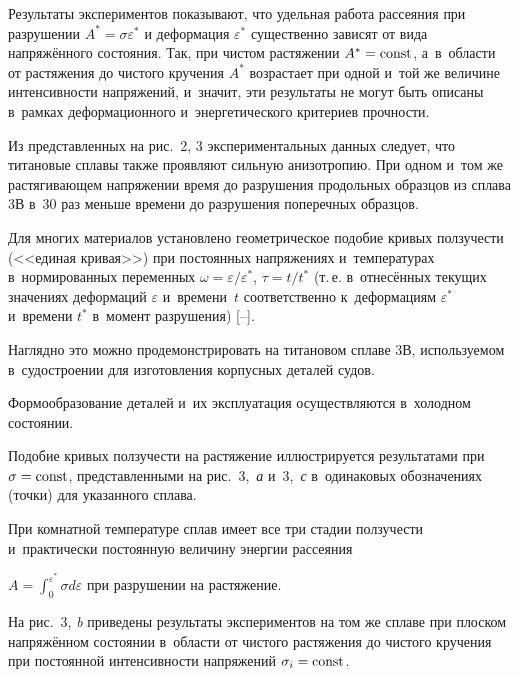 Результаты экспериментов показывают, что удельная работа рассеяния при разрушении $A^{*}=\sigma\varepsilon^{*}$  и деформация $\varepsilon^{*}$ существенно зависят от вида напряжённого состояния. Так, при чистом растяжении $A^{*}=\rm const$, а~в~области от растяжения до чистого кручения $A^{*}$ возрастает при одной и~той же величине интенсивности напряжений, и~значит, эти результаты не могут быть описаны в~рамках деформационного и~энергетического критериев прочности.



Из представленных на рис.~2, 3 экспериментальных данных следует, что титановые сплавы также проявляют сильную анизотропию. При одном и~том же растягивающем напряжении время до разрушения продольных образцов из сплава 3В в~30 раз меньше времени до разрушения поперечных образцов.






Для многих материалов установлено геометрическое подобие кривых ползучести (<<единая кривая>>) при постоянных напряжениях и~температурах в~нормированных переменных $\omega=\varepsilon/\varepsilon^{*}$, $\tau=t/t^{*}$ (т.\,е. в~отнесённых текущих значениях деформаций $\varepsilon$  и~времени~$t$ соответственно к~деформациям $\varepsilon^{*}$  и~времени $t^{*}$ в~момент разрушения) [--].



Наглядно это можно продемонстрировать на титановом сплаве 3В, используемом в~судостроении для изготовления корпусных деталей судов.

Формообразование деталей и~их эксплуатация осуществляются в~холодном состоянии.

Подобие кривых ползучести на растяжение иллюстрируется результатами при $\sigma = \rm const$, представленными на рис.~3,~{\sl а} и~3,~{\sl с} в~одинаковых обозначениях (точки) для указанного сплава.

При комнатной температуре сплав имеет  все три стадии ползучести и~практически постоянную величину энергии рассеяния

$A=\int_0^{\varepsilon^{*}}\sigma d\varepsilon$ при разрушении на растяжение.



На рис.~3, {\sl b} приведены результаты экспериментов на том же сплаве при плоском напряжённом состоянии в~области от чистого растяжения до чистого кручения при постоянной интенсивности напряжений $\sigma_{i} = \rm const$.

